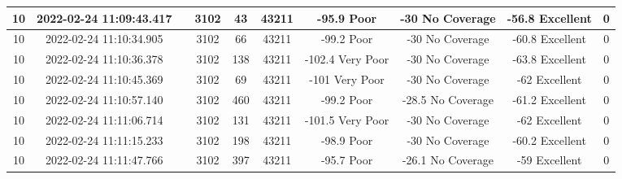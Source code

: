 \begin{longtable*}{|c|c|c|c|c|c|c|c|c|c|}
10&2022-02-24 11:09:43.417&&3102&43&43211& -95.9     Poor        & -30       No Coverage & -56.8     Excellent   & 0\\\hline
{}10&2022-02-24 11:10:34.905&&3102&66&43211& -99.2     Poor        & -30       No Coverage & -60.8     Excellent   & 0\\\hline
{}10&2022-02-24 11:10:36.378&&3102&138&43211& -102.4    Very Poor   & -30       No Coverage & -63.8     Excellent   & 0\\\hline
{}10&2022-02-24 11:10:45.369&&3102&69&43211& -101      Very Poor   & -30       No Coverage & -62       Excellent   & 0\\\hline
{}10&2022-02-24 11:10:57.140&&3102&460&43211& -99.2     Poor        & -28.5     No Coverage & -61.2     Excellent   & 0\\\hline
{}10&2022-02-24 11:11:06.714&&3102&131&43211& -101.5    Very Poor   & -30       No Coverage & -62       Excellent   & 0\\\hline
{}10&2022-02-24 11:11:15.233&&3102&198&43211& -98.9     Poor        & -30       No Coverage & -60.2     Excellent   & 0\\\hline
{}10&2022-02-24 11:11:47.766&&3102&397&43211& -95.7     Poor        & -26.1     No Coverage & -59       Excellent   & 0\\\hline

\end{longtable*}
